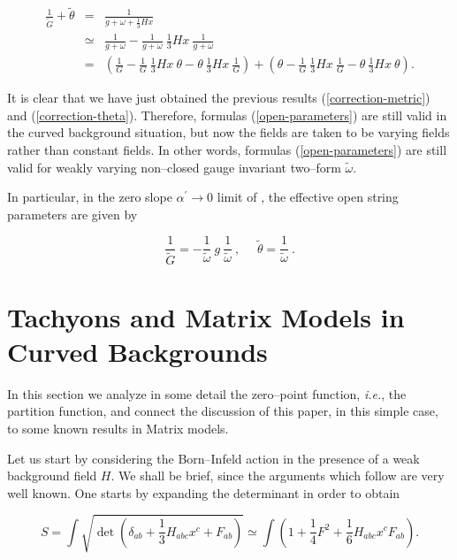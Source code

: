 \documentclass[a4paper,11pt]{article}
\newcommand{\notag}{\nonumber}
\begin{document}
\begin{eqnarray}
{\frac{1}{\widetilde{G}}} + \widetilde{\theta} &=& {\frac{1}{g + \omega + 
{\frac{1}{3}}Hx}} \notag \\
&\simeq& {\frac{1}{g+\omega}} - {\frac{1}{g+\omega}}\ 
{\frac{1}{3}} H x\ {\frac{1}{g+\omega}}  \notag \\
&=& \left( {\frac{1}{G}} - {\frac{1}{G}}\ {\frac{1}{3}} H x\ \theta -
\theta\ {\frac{1}{3}} H x\ {\frac{1}{G}} \right) + \left( \theta - 
{\frac{1}{G}}\ {\frac{1}{3}} H x\ {\frac{1}{G}} - \theta\ {\frac{1}{3}} 
H x\ \theta \right).  \notag
\end{eqnarray}

\noindent 
It is clear that we have just obtained the previous results
(\ref{correction-metric}) and (\ref{correction-theta}). Therefore, formulas
(\ref{open-parameters}) are still valid in the curved background situation,
but now the fields are taken to be varying fields rather than constant
fields. In other words, formulas (\ref{open-parameters}) are still valid
for weakly varying non--closed gauge invariant two--form
$\widetilde{\omega}$.

In particular, in the zero slope $\alpha^{\prime}\to 0$ limit of 
\cite{Seiberg-Witten}, the effective open string parameters are given by

\begin{equation}  \label{zero-slope}
{\frac{1}{\widetilde{G}}} = - {\frac{1}{\widetilde{\omega}}}\ g\ 
{\frac{1}{\widetilde{\omega}}}\ , \ \ \ \ \ \ \widetilde{\theta} = 
{\frac{1}{\widetilde{\omega}}}\ .
\end{equation}


\section{Tachyons and Matrix Models in Curved Backgrounds}


In this section we analyze in some detail the zero--point function, 
{\it i.e.}, the partition function, and connect the discussion
of this paper, in this simple case, to some known results in Matrix
models. 

Let us start by considering the Born--Infeld action in the presence of a
weak background field $H$. We shall be brief, since the arguments which
follow are very well known. One starts by expanding the determinant in
order to obtain

$$
S = \int \sqrt{ \det \left(\delta_{ab}+\frac{1}{3} H_{abc} x^c + 
F_{ab}\right) } \simeq \int \left(1 + \frac{1}{4} F^2 +
\frac{1}{6} H_{abc} x^c F_{ab} \right) .
$$
\end{document}
